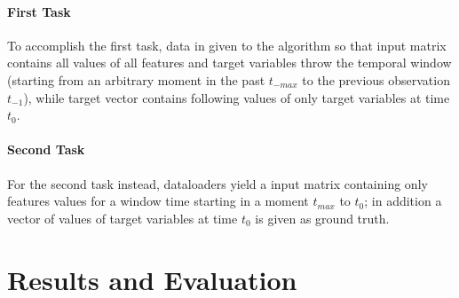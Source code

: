 \paragraph{First Task}
To accomplish the first task, data in given to the algorithm so that input matrix contains all values of all features and target variables throw the temporal window (starting from an arbitrary moment in the past $t_{-max}$ to the previous observation $t_{-1}$), while target vector contains following values of only target variables at time $t_0$.

\paragraph{Second Task}
For the second task instead, dataloaders yield a input matrix containing only features values for a window time starting in a moment $t_{max}$ to $t_0$; in addition a vector of values of target variables at time $t_0$ is given as ground truth.



\section{Results and Evaluation}
 
